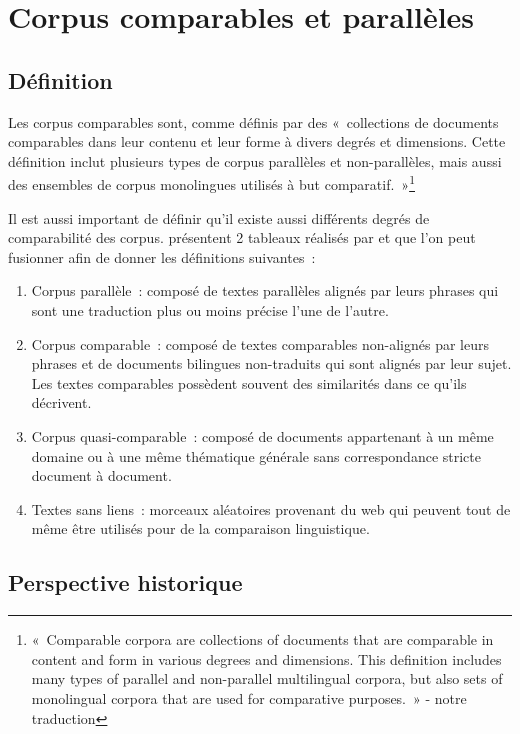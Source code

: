 \chapter{Corpus comparables et parallèles}

\section{Définition}

Les corpus comparables sont, comme définis par \citet{sharoff_2013b} des «~collections de documents
comparables dans leur contenu et leur forme à divers degrés et dimensions. Cette définition inclut
plusieurs types de corpus parallèles et non-parallèles, mais aussi des ensembles de corpus monolingues
utilisés à but comparatif.~»\footnote{«~Comparable corpora are collections of documents that are comparable
in content and form in various degrees and dimensions. This definition includes many types of parallel and
non-parallel multilingual corpora, but also sets of monolingual corpora that are used for comparative
purposes.~» \citep{sharoff_2013b} - notre traduction}

Il est aussi important de définir qu'il existe aussi différents degrés de comparabilité des corpus.
\citet{sharoff_2016} présentent 2 tableaux réalisés par \citet{sharoff_2013a} et \citet{wu_2005} que
l'on peut fusionner afin de donner les définitions suivantes~:
\begin{enumerate}
\item Corpus parallèle~: composé de textes parallèles alignés par leurs \linebreak phrases qui sont une
traduction plus ou moins précise l'une de l'autre.
\item Corpus comparable~: composé de textes comparables non-alignés par leurs phrases et de
documents bilingues non-traduits qui sont alignés par leur sujet. Les textes comparables possèdent
souvent des similarités dans ce qu'ils décrivent.
\item Corpus quasi-comparable~: composé de documents appartenant à un même
domaine ou à une même thématique générale sans correspondance stricte document à document.
\item Textes sans liens~: morceaux aléatoires provenant du web qui peuvent tout de même être
utilisés pour de la comparaison linguistique.
\end{enumerate}

\newpage

\section{Perspective historique}

